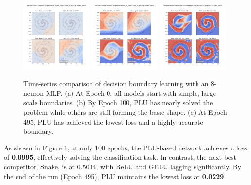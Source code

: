 \documentclass[11pt, letterpaper]{article}
\begin{document}
\begin{figure}[h!]
    \centering
    \includegraphics[width=0.32\textwidth]{Examples/spiral_activation_comparison_hidden_neurons_8_epoch_0.jpg}
    \includegraphics[width=0.32\textwidth]{Examples/spiral_activation_comparison_hidden_neurons_8_epoch_100.jpg}
    \includegraphics[width=0.32\textwidth]{Examples/spiral_activation_comparison_hidden_neurons_8_epoch_495.jpg}
    \caption{Time-series comparison of decision boundary learning with an 8-neuron MLP. (a) At Epoch 0, all models start with simple, large-scale boundaries. (b) By Epoch 100, PLU has nearly solved the problem while others are still forming the basic shape. (c) At Epoch 495, PLU has achieved the lowest loss and a highly accurate boundary.}
    \label{fig:spiral_8_neurons}
\end{figure}

As shown in Figure \ref{fig:spiral_8_neurons}, at only 100 epochs, the PLU-based network achieves a loss of \textbf{0.0995}, effectively solving the classification task. In contrast, the next best competitor, Snake, is at 0.5044, with ReLU and GELU lagging significantly. By the end of the run (Epoch 495), PLU maintains the lowest loss at \textbf{0.0229}.
\end{document}
